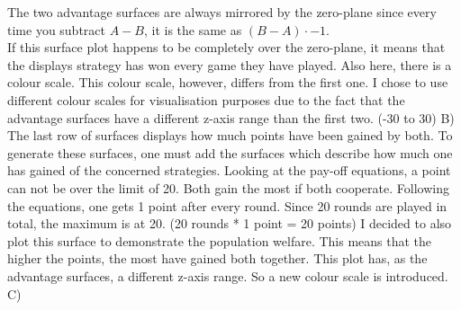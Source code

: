 \documentclass{article}
\begin{document}
The two advantage surfaces are always mirrored by the zero-plane since every time you subtract $A-B$, it is the same as $(B-A) \cdot -1$.\\
If this surface plot happens to be completely over the zero-plane, it means that the displays strategy has won every game they have played.
Also here, there is a colour scale.
This colour scale, however, differs from the first one.
I chose to use different colour scales for visualisation purposes due to the fact that the advantage surfaces have a different z-axis range than the first two.
(-30 to 30)
B)
The last row of surfaces displays how much points have been gained by both.
To generate these surfaces, one must add the surfaces which describe how much one has gained of the concerned strategies.
Looking at the pay-off equations, a point can not be over the limit of 20.
Both gain the most if both cooperate.
Following the equations, one gets 1 point after every round.
Since 20 rounds are played in total, the maximum is at 20.
(20 rounds * 1 point = 20 points)
I decided to also plot this surface to demonstrate the population welfare.
This means that the higher the points, the most have gained both together.
This plot has, as the advantage surfaces, a different z-axis range.
So a new colour scale is introduced.
C)
\newpage


\newpage

\def \w {0.16}
\def \a {45}
\end{document}
